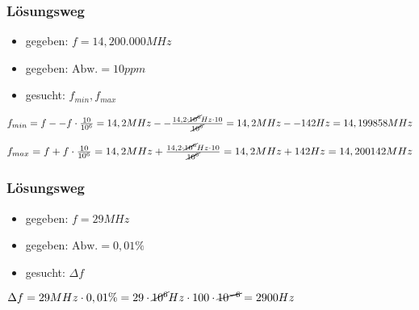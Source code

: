 \begin{frame}
\frametitle{Lösungsweg}
\begin{itemize}
  \item gegeben: $f = 14,200.000MHz$
  \item gegeben: $\textrm{Abw.} = 10ppm$
  \item gesucht: $f_{min}, f_{max}$
  \end{itemize}
    \pause
    $f_{min} = f -- f \cdot \frac{10}{10^6} = 14,2MHz -- \frac{14,2\cdot \cancel{10^6}Hz\cdot 10}{\cancel{10^6}} = 14,2MHz -- 142Hz = 14,199858MHz$

$f_{max} = f + f \cdot \frac{10}{10^6} = 14,2MHz + \frac{14,2\cdot \cancel{10^6}Hz\cdot 10}{\cancel{10^6}} = 14,2MHz + 142Hz = 14,200142MHz$



\end{frame}

\begin{frame}
\end{frame}

\begin{frame}
\frametitle{Lösungsweg}
\begin{itemize}
  \item gegeben: $f = 29MHz$
  \item gegeben: $\textrm{Abw.} = 0,01\%$
  \item gesucht: $\Delta f$
  \end{itemize}
    \pause
    $\Delta f = 29MHz \cdot 0,01\% = 29\cdot \cancel{10^6}Hz \cdot 100\cdot \cancel{10^{-6}} = 2900Hz$



\end{frame}

